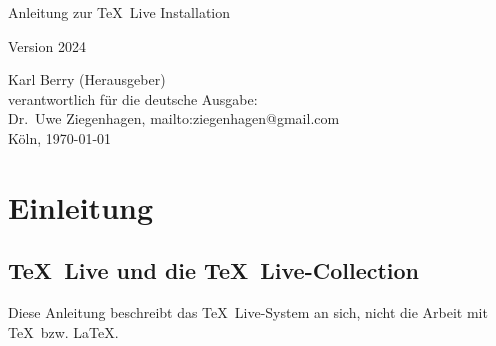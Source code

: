 \documentclass[12pt,ngerman,a4paper,fullparskip]{report}
\newcommand{\tlcurrentyear}{2024}
\newcommand{\TL}{\TeX\ Live\xspace}
\newcommand{\href}[2]{#1}
\begin{document}
\begin{titlepage}

\begin{center}
\vspace*{3cm}

 \Huge Anleitung zur \TL Installation \vspace*{1cm}

\Large Version \tlcurrentyear

\end{center}

\vfill \noindent Karl Berry (Herausgeber) \\
verantwortlich für die deutsche Ausgabe:\\ 
Dr.~Uwe Ziegenhagen, \href{mailto:ziegenhagen@gmail.com}{ziegenhagen@gmail.com} \\
Köln, \today
\end{titlepage}


\tableofcontents



\listoffigures



%
%


\chapter{Einleitung}\label{sec:intro}
\section{\TL und die \TL-Collection}

Diese Anleitung beschreibt das \TL-System an sich, nicht die Arbeit mit \TeX\ bzw. \LaTeX. 
\end{document}
